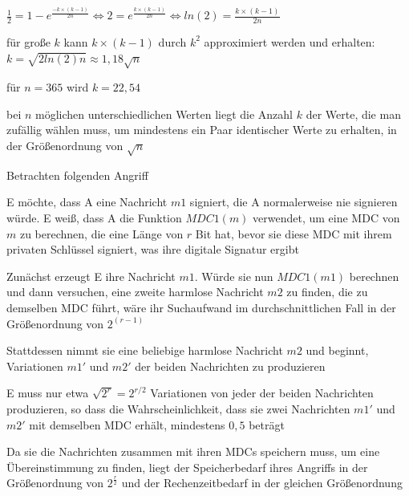 \documentclass[a4paper]{article}
\begin{document}
\begin{multicols}{3}
\begin{itemize*}
\begin{itemize*}
                  \item $\frac{1}{2}=1-e^{\frac{-k\times(k-1)}{2n}}\Leftrightarrow 2=e^{\frac{k\times(k-1)}{2n}}\Leftrightarrow ln(2)=\frac{k\times(k-1)}{2n}$
                  \item für große $k$ kann $k\times(k-1)$ durch $k^2$ approximiert werden und erhalten: $k=\sqrt{2 ln(2)n}\approx 1,18\sqrt{n}$
                  \item für $n=365$ wird $k=22,54$%
            \end{itemize*}
            \item bei $n$ möglichen unterschiedlichen Werten liegt die Anzahl $k$ der Werte, die man zufällig wählen muss, um mindestens ein Paar identischer Werte zu erhalten, in der Größenordnung von $\sqrt{n}$
            \item Betrachten folgenden Angriff
            \begin{itemize*}
                  \item E möchte, dass A eine Nachricht $m1$ signiert, die A normalerweise nie signieren würde. E weiß, dass A die Funktion $MDC1(m)$ verwendet, um eine MDC von $m$ zu berechnen, die eine Länge von $r$ Bit hat, bevor sie diese MDC mit ihrem privaten Schlüssel signiert, was ihre digitale Signatur ergibt
                  \item Zunächst erzeugt E ihre Nachricht $m1$. Würde sie nun $MDC1(m1)$ berechnen und dann versuchen, eine zweite harmlose Nachricht $m2$ zu finden, die zu demselben MDC führt, wäre ihr Suchaufwand im durchschnittlichen Fall in der Größenordnung von $2^{(r-1)}$
                  \item Stattdessen nimmt sie eine beliebige harmlose Nachricht $m2$ und beginnt, Variationen $m1'$ und $m2'$ der beiden Nachrichten zu produzieren%
            \end{itemize*}
            \item E muss nur etwa $\sqrt{2^r}=2^{r/2}$ Variationen von jeder der beiden Nachrichten produzieren, so dass die Wahrscheinlichkeit, dass sie zwei Nachrichten $m1'$ und $m2'$ mit demselben MDC erhält, mindestens $0,5$ beträgt
            \item Da sie die Nachrichten zusammen mit ihren MDCs speichern muss, um eine Übereinstimmung zu finden, liegt der Speicherbedarf ihres Angriffs in der Größenordnung von $2^{\frac{r}{2}}$ und der Rechenzeitbedarf in der gleichen Größenordnung

\end{itemize*}
\end{multicols}
\end{document}

